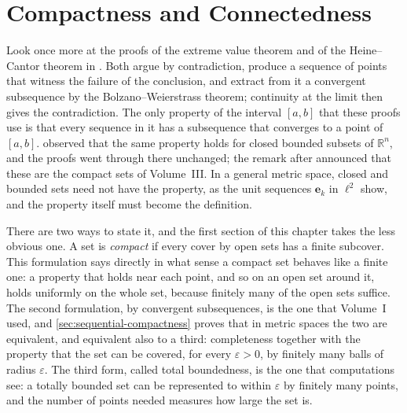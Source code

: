 \chapter{Compactness and Connectedness}
\label{ch:compactness}


Look once more at the proofs of the extreme value theorem and of the Heine--Cantor theorem in . Both argue by contradiction, produce a sequence of points that witness the failure of the conclusion, and extract from it a convergent subsequence by the Bolzano--Weierstrass theorem; continuity at the limit then gives the contradiction. The only property of the interval $[a,b]$ that these proofs use is that every sequence in it has a subsequence that converges to a point of $[a,b]$.  observed that the same property holds for closed bounded subsets of $\mathbb R^n$, and the proofs went through there unchanged; the remark after  announced that these are the compact sets of Volume~III. In a general metric space, closed and bounded sets need not have the property, as the unit sequences $\mathbf e_k$ in $\ell^2$ show, and the property itself must become the definition.

There are two ways to state it, and the first section of this chapter takes the less obvious one. A set is \emph{compact} if every cover by open sets has a finite subcover. This formulation says directly in what sense a compact set behaves like a finite one: a property that holds near each point, and so on an open set around it, holds uniformly on the whole set, because finitely many of the open sets suffice. The second formulation, by convergent subsequences, is the one that Volume~I used, and \cref{sec:sequential-compactness} proves that in metric spaces the two are equivalent, and equivalent also to a third: completeness together with the property that the set can be covered, for every $\varepsilon>0$, by finitely many balls of radius $\varepsilon$. The third form, called total boundedness, is the one that computations see: a totally bounded set can be represented to within $\varepsilon$ by finitely many points, and the number of points needed measures how large the set is.

